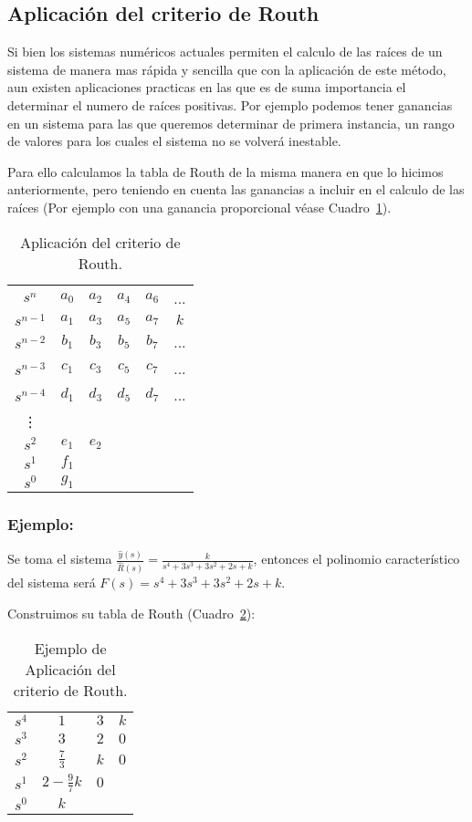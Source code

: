 \subsection{Aplicación del criterio de Routh}
Si bien los sistemas numéricos actuales permiten el calculo de las raíces de un sistema de manera mas rápida y sencilla que con la aplicación de este método, aun existen aplicaciones practicas en las que es de suma importancia el determinar el numero de raíces positivas. Por ejemplo podemos tener ganancias en un sistema para las que queremos determinar de primera instancia, un rango de valores para los cuales el sistema no se volverá inestable.

Para ello calculamos la tabla de Routh de la misma manera en que lo hicimos anteriormente, pero teniendo en cuenta las ganancias a incluir en el calculo de las raíces (Por ejemplo con una ganancia proporcional véase Cuadro~\ref{tab:Aplicacion}).

\begin{table}[htbp]
\centering
\begin{tabular}{c|c c c c c}
$s^n$     & $a_0$ & $a_2$ & $a_4$ & $a_6$ & ...\\
$s^{n-1}$ & $a_1$ & $a_3$ & $a_5$ & $a_7$ & $k$\\
$s^{n-2}$ & $b_1$ & $b_3$ & $b_5$ & $b_7$ & ...\\
$s^{n-3}$ & $c_1$ & $c_3$ & $c_5$ & $c_7$ & ...\\
$s^{n-4}$ & $d_1$ & $d_3$ & $d_5$ & $d_7$ & ...\\
\vdots                                         \\
$s^2$ & $e_1$ & $e_2$                          \\
$s^1$ & $f_1$                                  \\
$s^0$ & $g_1$
\end{tabular}
\caption{\label{tab:Aplicacion}Aplicación del criterio de Routh.}
\end{table}

\subsubsection{Ejemplo:}
Se toma el sistema $\frac{\hat{y}(s)}{\hat{R}(s)} = \frac{k}{s^4 + 3 s^3 + 3 s^2 + 2 s + k}$, entonces el polinomio característico del sistema será $F(s) = s^4 + 3 s^3 + 3 s^2 + 2 s + k$.

Construimos su tabla de Routh (Cuadro~\ref{tab:EjemploAplicacion}):

\begin{table}[htbp]
\centering
\begin{tabular}{c|c c c}
$s^4$ & $1$ & $3$ & $k$ \\
$s^3$ & $3$ & $2$ & $0$ \\
$s^2$ & $\frac{7}{3}$ & $k$ & $0$ \\
$s^1$ & $2 - \frac{9}{7} k$ & $0$ \\
$s^0$ & $k$
\end{tabular}
\caption{\label{tab:EjemploAplicacion}Ejemplo de Aplicación del criterio de Routh.}
\end{table}

